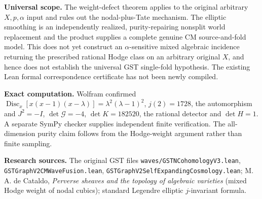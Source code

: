 \documentclass[11pt]{article}
\begin{document}
\noindent\textbf{Universal scope.} The weight-defect theorem applies to the original arbitrary \(X,p,\alpha\) input and rules out the nodal-plus-Tate mechanism. The elliptic smoothing is an independently realized, purity-repairing nonsplit world replacement and the product supplies a complete genuine CM source-and-fold model. This does not yet construct an \(\alpha\)-sensitive mixed algebraic incidence returning the prescribed rational Hodge class on an arbitrary original \(X\), and hence does not establish the universal GST single-fold hypothesis. The existing Lean formal correspondence certificate has not been newly compiled.

\noindent\textbf{Exact computation.} Wolfram confirmed \(\operatorname{Disc}_x[x(x-1)(x-\lambda)]=\lambda^2(\lambda-1)^2\), \(j(2)=1728\), the automorphism and \(J^2=-I\), \(\det\mathcal G=-4\), \(\det K=182520\), the rational detector and \(\det H=1\). A separate SymPy checker supplies independent finite verification. The all-dimension purity claim follows from the Hodge-weight argument rather than finite sampling.

\noindent\textbf{Research sources.} The original GST files \texttt{waves/GSTNCohomologyV3.lean}, \texttt{GSTGraphV2CMWaveFusion.lean}, \texttt{GSTGraphV2SelfExpandingCosmology.lean}; M. A. de Cataldo, \emph{Perverse sheaves and the topology of algebraic varieties} (mixed Hodge weight of nodal cubics); standard Legendre elliptic \(j\)-invariant formula.
\end{document}
